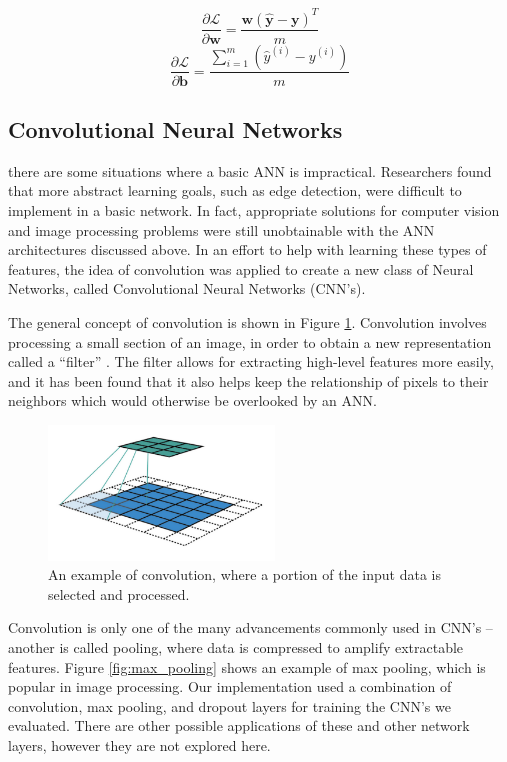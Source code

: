 \documentclass[letterpaper]{article} %
\begin{document}
\begin{equation}
\frac{\partial \mathcal{L}}{\partial \mathbf{w}} =
\frac{\mathbf{w}(\hat{\mathbf{y}} - \mathbf{y})^T}{m}
\end{equation}
\begin{equation}
\frac{\partial \mathcal{L}}{\partial \mathbf{b}} =
\frac{\sum_{i=1}^{m}(\hat{y}^{(i)} - y^{(i)})}{m}
\end{equation}

\subsection{Convolutional Neural Networks}
there are some situations where a basic ANN is impractical.
Researchers found that more abstract learning goals, such as edge detection,
were difficult to implement in a basic network.
In fact, appropriate solutions for computer vision and image processing problems were still unobtainable
with the ANN architectures discussed above.
In an effort to help with learning these types of features, the idea of convolution was applied
to create a new class of Neural Networks, called
Convolutional Neural Networks (CNN's).

The general concept of convolution is shown in Figure \ref{fig:convolution}.
Convolution involves processing a small section of an image, in order to obtain a new representation called a ``filter''
\cite{imagenet}.
The filter allows for extracting high-level features more easily,
and it has been found that it also helps keep the relationship of pixels to their neighbors
which would otherwise be overlooked by an ANN.

\begin{figure}[htbp]
\centerline{\includegraphics[width=6cm]{convolution.png}}
\caption{An example of convolution, where a portion of the input data is selected and processed.}
\label{fig:convolution}
\end{figure}

Convolution is only one of the many advancements commonly used in CNN's --
another is called pooling, where data is compressed to amplify extractable features.
Figure \ref{fig:max_pooling} shows an example of max pooling, which is popular in image processing.
Our implementation used a combination of convolution, max pooling, and dropout layers
for training the CNN's we evaluated.
There are other possible applications of these and other network layers,
however they are not explored here.
\end{document}
